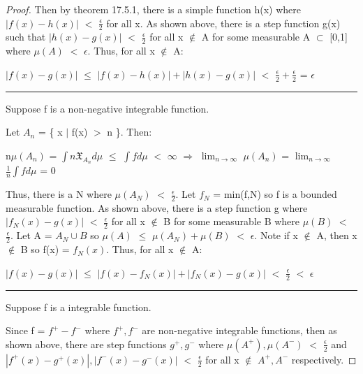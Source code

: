 \begin{proof}
        Then by {\color{red} theorem 17.5.1}, there is a simple function
        h(x) where $|f(x) - h(x)|$ $<$ $\frac{\epsilon}{2}$ for all x.
        As shown above, there is a step function g(x)
        such that $|h(x) - g(x)|$ $<$ $\frac{\epsilon}{2}$
        for all x $\not \in$ A for some measurable A $\subset$ [0,1]
        where $\mu(A)$ $<$ $\epsilon$. Thus, for all x $\not \in$ A:

        \hspace{0.5cm}
        $|f(x) - g(x)|$
        $\leq$ $|f(x) - h(x)| + |h(x) - g(x)|$
        $<$ $\frac{\epsilon}{2} + \frac{\epsilon}{2}$
        = $\epsilon$

        \rule[0.1cm]{15.2cm}{0.01cm}

        Suppose f is a non-negative integrable function.

        Let $A_n$ = \{ x $|$ f(x) $>$ n \}. Then:

        \hspace{0.5cm}
        n$\mu(A_n)$ = $\int n \mathfrak{X}_{A_n} d\mu$
        $\leq$ $\int f d\mu$
        $<$ $\infty$
        \hspace{0.2cm}
        $\Rightarrow$
        \hspace{0.2cm}
        $\lim_{n \rightarrow \infty}$ $\mu(A_n)$
        = $\lim_{n \rightarrow \infty}$ $\frac{1}{n} \int f d\mu$
        = 0

        Thus, there is a N where $\mu(A_N)$ $<$ $\frac{\epsilon}{2}$.
        Let $f_N$ = min(f,N) so f is a bounded measurable function.
        As shown above, there is a step function g where
        $|f_N(x) - g(x)|$ $<$ $\frac{\epsilon}{2}$
        for all x $\not \in$ B for some measurable B
        where $\mu(B)$ $<$ $\frac{\epsilon}{2}$.
        Let A = $A_N \cup B$ so $\mu(A)$ $\leq$ $\mu(A_N) + \mu(B)$
        $<$ $\epsilon$.
        Note if x $\not \in$ A, then x $\not \in$ B so f(x) = $f_N(x)$.
        Thus, for all x $\not \in$ A:

        \hspace{0.5cm}
        $|f(x) - g(x)|$
        $\leq$ $|f(x) - f_N(x)| + |f_N(x) - g(x)|$
        $<$ $\frac{\epsilon}{2}$
        $<$ $\epsilon$

        \rule[0.1cm]{15.2cm}{0.01cm}

        Suppose f is a integrable function.

        Since f = $f^+ - f^-$ where $f^+,f^-$ are non-negative integrable
        functions, then as shown above, there are step functions
        $g^+,g^-$ where $\mu(A^+),\mu(A^-)$ $<$ $\frac{\epsilon}{2}$
        and $|f^+(x) - g^+(x)|,|f^-(x) - g^-(x)|$ $<$ $\frac{\epsilon}{2}$
        for all x $\not \in$ $A^+,A^-$ respectively.
        

\end{proof}
